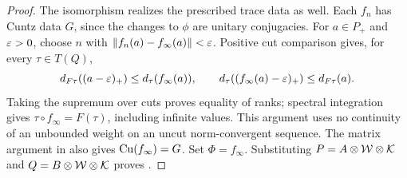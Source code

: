 \begin{proof}
The isomorphism realizes the prescribed trace data as well. Each
\(f_n\) has Cuntz data \(G\), since the changes to \(\phi\) are
unitary conjugacies. For \(a\in P_+\) and \(\varepsilon>0\), choose \(n\)
with \(\|f_n(a)-f_\infty(a)\|<\varepsilon\). Positive cut comparison gives,
for every \(\tau\in T(Q)\),
\[
 d_{F\tau}((a-\varepsilon)_+)\leq d_\tau(f_\infty(a)),\qquad
 d_\tau((f_\infty(a)-\varepsilon)_+)\leq d_{F\tau}(a).
\]
Taking the supremum over cuts proves equality of ranks; spectral
integration gives \(\tau\circ f_\infty=F(\tau)\), including infinite
values. This argument uses no continuity of an unbounded weight on
an uncut norm-convergent sequence. The matrix argument in
 also gives \(\operatorname{Cu}(f_\infty)=G\).
Set \(\Phi=f_\infty\). Substituting
\(P=A\otimes\mathcal W\otimes\mathcal K\) and
\(Q=B\otimes\mathcal W\otimes\mathcal K\) proves .
\end{proof}

